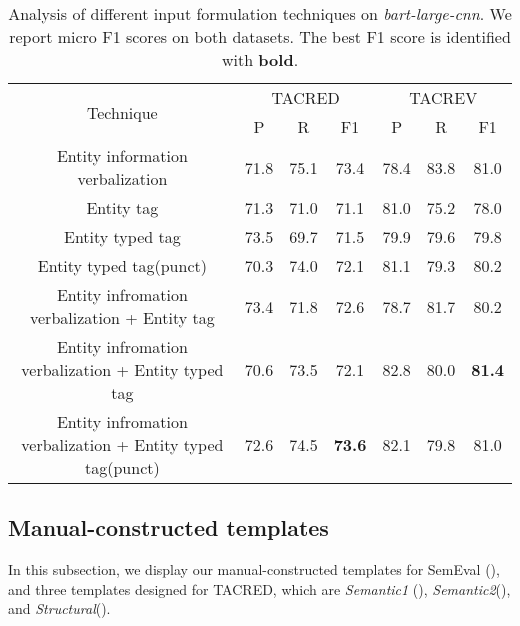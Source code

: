 \begin{table*}[h]
    \centering
    \begin{threeparttable}
    \small
    \begin{tabular}{ccccccc}
    \toprule
    \multirow{2}{*}{Technique} & \multicolumn{3}{c}{TACRED} & \multicolumn{3}{c}{TACREV} \\
    \cline{2-7}
    & P & R & F1 & P & R & F1 \\
    \midrule
    Entity information verbalization & 71.8 & 75.1 & 73.4 & 78.4 & 83.8 & 81.0 \\ 
    Entity tag & 71.3 & 71.0 & 71.1 & 81.0 & 75.2 & 78.0 \\ 
    Entity typed tag & 73.5 & 69.7 & 71.5 & 79.9 & 79.6 & 79.8 \\ 
    Entity typed tag(punct) & 70.3 & 74.0 & 72.1 & 81.1 & 79.3 & 80.2 \\ 
    Entity infromation verbalization + Entity tag & 73.4 & 71.8 & 72.6 & 78.7 & 81.7 & 80.2 \\ 
    Entity infromation verbalization + Entity typed tag        & 70.6 & 73.5 & 72.1 & 82.8 & 80.0 & \textbf{81.4} \\
    Entity infromation verbalization + Entity typed tag(punct) & 72.6 & 74.5 & \textbf{73.6} & 82.1 & 79.8 & 81.0 \\
    \bottomrule
    \end{tabular}
    \end{threeparttable}
    \caption{Analysis of different input formulation techniques on \emph{bart-large-cnn}. We report micro F1 scores on both datasets. The best F1 score is identified with \textbf{bold}.}
    \label{tab:result-input-formulation-bart-large-cnn}
\end{table*}

\subsection{Manual-constructed templates}

In this subsection, we display our manual-constructed templates for SemEval (), and three templates designed for TACRED, which are \textit{Semantic1} (), \textit{Semantic2}(), and \textit{Structural}().

